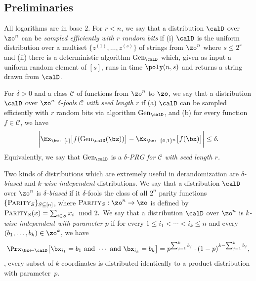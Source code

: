 \documentclass{toc}
\theoremstyle{plain}
\begin{document}
\subsection{Preliminaries} \label{sec:prelim}

All logarithms are in base $2$. %
For $r < n$, we say that a distribution $\calD$ over $\zo^n$ can be \emph{sampled efficiently with $r$ random bits} if (i) $\calD$ is the uniform distribution over a multiset $\{z^{(1)},\dots,z^{(s)}\}$ of strings from $\zo^n$  where $s \leq 2^r$
%
and (ii) there is a deterministic algorithm $\mathrm{Gen}_{\calD}$ which, given as input a uniform random element of $[s]$, runs in time $\poly(n,s)$ and returns a string drawn from $\calD$.

%
%

For $\delta>0$ and a class $\mathscr{C}$ of functions from $\zo^n$ to $\zo$, we say that a distribution $\calD$ over $\zo^n$ \emph{$\delta$-fools $\mathscr{C}$ with seed length $r$} if (a) $\calD$ can be sampled efficiently with $r$ random bits via algorithm $\mathrm{Gen}_\calD$, and (b) for every function $f \in \mathscr{C}$, we have
\[
\bigg|\Ex_{\bz \leftarrow [s]}\big[f(\mathrm{Gen}_{\calD}(\bz))\big] - 
\Ex_{\bx \leftarrow \{0,1\}^n}\big[f(\bx)\big]\bigg| \leq \delta.
\]
Equivalently, we say that $\mathrm{Gen}_\calD$ is a \emph{$\delta$-PRG for $\mathscr{C}$ with seed length $r$.}

Two kinds of distributions which are extremely useful in derandomization are \emph{$\delta$-biased} and \emph{$k$-wise independent} distributions.
We say that a distribution $\calD$ over $\zo^n$ is \emph{$\delta$-biased} if it $\delta$-fools the class 
of all $2^n$ parity functions $\{\text{{\sc Parity}}_S\}_{S \subseteq [n]}$, where $\text{{\sc Parity}}_S: \zo^n \to \zo$ is defined
by $\text{{\sc Parity}}_S(x) = \sum_{i \in S} x_i \mod 2.$
We say that a distribution $\calD$ over $\zo^n$ is \emph{$k$-wise independent with parameter $p$} if for every $1 \leq i_1 < \cdots < i_k \leq n$ and every $(b_1,\dots,b_k) \in \zo^k$, we have
\[
\Prx_{\bx \leftarrow \calD}\big[\bx_{i_1} = b_1 \text{~and~} \cdots \text{~and~}\bx_{i_k} = b_k\big] = p^{\sum_{j=1}^k b_j}  \cdot
(1-p)^{k - \sum_{j=1}^k b_j},
\]
\ie, every subset of $k$ coordinates is distributed identically to a product distribution with parameter~$p$.
\end{document}
